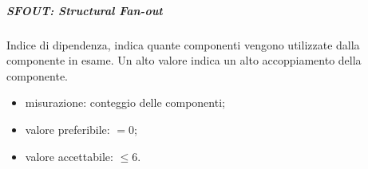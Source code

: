 			\subparagraph{SFOUT: Structural Fan-out}
			Indice di dipendenza, indica quante componenti vengono utilizzate dalla componente in esame. Un alto valore indica un alto accoppiamento della componente.
			\begin{itemize}
				\item misurazione: conteggio delle componenti;
				\item valore preferibile: $ = 0$;
				\item valore accettabile: $ \leq 6$.
			\end{itemize}
\pagebreak
